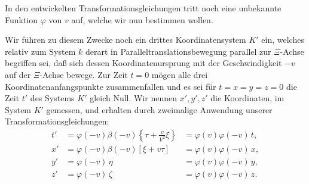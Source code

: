 \documentclass[17pt]{webarticle}       %
\begin{document}
In den entwickelten Transformationsgleichungen tritt noch eine unbekannte Funktion \(\varphi\) von \( v \) auf, welche wir nun bestimmen wollen.

Wir führen zu diesem Zwecke noch ein drittes Koordinatensystem \( K' \) ein, welches relativ zum System \( k \) derart in Paralleltranslationsbewegung parallel zur \( \Xi \)-Achse begriffen sei, daß sich dessen Koordinatenursprung mit der Geschwindigkeit \( -v \) auf der \( \Xi \)-Achse bewege. Zur Zeit \( t = 0 \) mögen alle drei Koordinatenanfangspunkte zusammenfallen und es sei für \( t = x = y = z = 0 \) die Zeit \( t' \) des Systems \( K' \) gleich Null. Wir nennen \( x', y', z' \) die Koordinaten, im System \( K' \) gemessen, und erhalten durch zweimalige Anwendung unserer Transformationsgleichungen:
\[
\begin{aligned}
t' &= \varphi(-v) \beta(-v) \left\{ \tau + \frac{v}{V^2} \xi \right\} &= \varphi(v) \varphi(-v) \, t,
\\
x' &= \varphi(-v) \beta(-v) [\xi + v \tau] &= \varphi(v) \varphi(-v) \, x,
\\
y' &= \varphi(-v) \, \eta &= \varphi(v) \varphi(-v) \, y,
\\
z' &= \varphi(-v) \, \zeta &= \varphi(v) \varphi(-v) \, z.
\end{aligned}
\]
\end{document}
